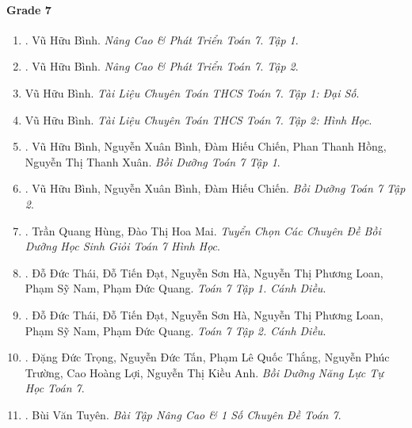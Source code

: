 \documentclass{article}
\begin{document}
\paragraph{Grade 7}

\begin{enumerate}
	\item \cite{Binh_Toan_7_tap_1}. Vũ Hữu Bình. {\it Nâng Cao \& Phát Triển Toán 7. Tập 1}.\hfill{\sf[done]}
	
	\item \cite{Binh_Toan_7_tap_2}. Vũ Hữu Bình. {\it Nâng Cao \& Phát Triển Toán 7. Tập 2}.\hfill{\sf[done]}
	
	\item Vũ Hữu Bình. {\it Tài Liệu Chuyên Toán THCS Toán 7. Tập 1: Đại Số}.
	
	\item Vũ Hữu Bình. {\it Tài Liệu Chuyên Toán THCS Toán 7. Tập 2: Hình Học}.
	
	\item \cite{Binh_boi_duong_Toan_7_tap_1}. Vũ Hữu Bình, Nguyễn Xuân Bình, Đàm Hiếu Chiến, Phan Thanh Hồng, Nguyễn Thị Thanh Xuân. {\it Bồi Dưỡng Toán 7 Tập 1}.\hfill{\sf[reading]}
	
	\item \cite{Binh_boi_duong_Toan_7_tap_2}. Vũ Hữu Bình, Nguyễn Xuân Bình, Đàm Hiếu Chiến. {\it Bồi Dưỡng Toán 7 Tập 2}.\hfill{\sf[reading]}
	
	\item \cite{Hung_Mai_Toan_7_hinh_hoc}. Trần Quang Hùng, Đào Thị Hoa Mai. {\it Tuyển Chọn Các Chuyên Đề Bồi Dưỡng Học Sinh Giỏi Toán 7 Hình Học}.
	
	\item \cite{SGK_Toan_7_Canh_Dieu_tap_1}. Đỗ Đức Thái, Đỗ Tiến Đạt, Nguyễn Sơn Hà, Nguyễn Thị Phương Loan, Phạm Sỹ Nam, Phạm Đức Quang. {\it Toán 7 Tập 1. Cánh Diều}.\hfill{\sf[done]}
	
	\item \cite{SGK_Toan_7_Canh_Dieu_tap_2}. Đỗ Đức Thái, Đỗ Tiến Đạt, Nguyễn Sơn Hà, Nguyễn Thị Phương Loan, Phạm Sỹ Nam, Phạm Đức Quang. {\it Toán 7 Tập 2. Cánh Diều}.\hfill{\sf[done]}
	
	\item \cite{Trong_Toan_7}. Đặng Đức Trọng, Nguyễn Đức Tấn, Phạm Lê Quốc Thắng, Nguyễn Phúc Trường, Cao Hoàng Lợi, Nguyễn Thị Kiều Anh. {\it Bồi Dưỡng Năng Lực Tự Học Toán 7}.\hfill{\sf[reading]}
	
	\item \cite{Tuyen_Toan_7}. Bùi Văn Tuyên. {\it Bài Tập Nâng Cao \& 1 Số Chuyên Đề Toán 7}.\hfill{\sf[done]}
\end{enumerate}
\end{document}
